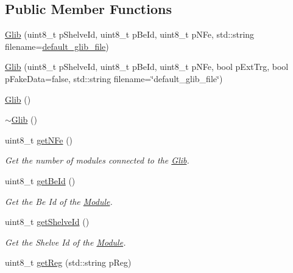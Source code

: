 \subsection*{Public Member Functions}
\begin{DoxyCompactItemize}
\item 
\hyperlink{class_ph2___hw_description_1_1_glib_ac63dbf3825526283c7cefc5e217e1c38}{Glib} (uint8\-\_\-t p\-Shelve\-Id, uint8\-\_\-t p\-Be\-Id, uint8\-\_\-t p\-N\-Fe, std\-::string filename=\hyperlink{_glib_8h_a3b2796757992a47db4ed9462093d6fe3}{default\-\_\-glib\-\_\-file})
\item 
\hyperlink{class_ph2___hw_description_1_1_glib_a05a22fe40ace0d74f5493cbded54bd99}{Glib} (uint8\-\_\-t p\-Shelve\-Id, uint8\-\_\-t p\-Be\-Id, uint8\-\_\-t p\-N\-Fe, bool p\-Ext\-Trg, bool p\-Fake\-Data=false, std\-::string filename=\char`\"{}default\-\_\-glib\-\_\-file\char`\"{})
\item 
\hyperlink{class_ph2___hw_description_1_1_glib_a2d9eece9012cdc452f43895852693329}{Glib} ()
\item 
\hyperlink{class_ph2___hw_description_1_1_glib_a2fa668cf8b827199d63be060616a70cd}{$\sim$\-Glib} ()
\item 
uint8\-\_\-t \hyperlink{class_ph2___hw_description_1_1_glib_a2675c993dad690792592ba3e30036bab}{get\-N\-Fe} ()
\begin{DoxyCompactList}\small\item\em Get the number of modules connected to the \hyperlink{class_ph2___hw_description_1_1_glib}{Glib}. \end{DoxyCompactList}\item 
uint8\-\_\-t \hyperlink{class_ph2___hw_description_1_1_glib_a27f5e85e68f25e56d1096306e3f70188}{get\-Be\-Id} ()
\begin{DoxyCompactList}\small\item\em Get the Be Id of the \hyperlink{class_ph2___hw_description_1_1_module}{Module}. \end{DoxyCompactList}\item 
uint8\-\_\-t \hyperlink{class_ph2___hw_description_1_1_glib_ac3130c4a08d624c6d89fc66474efd6d8}{get\-Shelve\-Id} ()
\begin{DoxyCompactList}\small\item\em Get the Shelve Id of the \hyperlink{class_ph2___hw_description_1_1_module}{Module}. \end{DoxyCompactList}\item 
uint8\-\_\-t \hyperlink{class_ph2___hw_description_1_1_glib_ade845c9d6a9fcaaac1766cf89592fb97}{get\-Reg} (std\-::string p\-Reg)

\end{DoxyCompactItemize}
